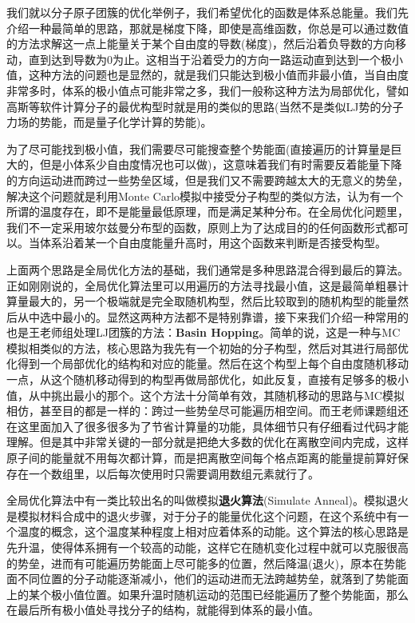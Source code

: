 \documentclass[12pt,a4paper,openany,twoside]{book}
\numberwithin{equation}{section}
\begin{document}
      我们就以分子原子团簇的优化举例子，我们希望优化的函数是体系总能量。我们先介绍一种最简单的思路，那就是梯度下降，即使是高维函数，你总是可以通过数值的方法求解这一点上能量关于某个自由度的导数(梯度)，然后沿着负导数的方向移动，直到达到导数为0为止。这相当于沿着受力的方向一路运动直到达到一个极小值，这种方法的问题也是显然的，就是我们只能达到极小值而非最小值，当自由度非常多时，体系的极小值点可能非常之多，我们一般称这种方法为局部优化，譬如高斯等软件计算分子的最优构型时就是用的类似的思路(当然不是类似LJ势的分子力场的势能，而是量子化学计算的势能)。

      为了尽可能找到极小值，我们需要尽可能搜查整个势能面(直接遍历的计算量是巨大的，但是小体系少自由度情况也可以做)，这意味着我们有时需要反着能量下降的方向运动进而跨过一些势垒区域，但是我们又不需要跨越太大的无意义的势垒，解决这个问题就是利用Monte Carlo模拟中接受分子构型的类似方法，认为有一个所谓的温度存在，即不是能量最低原理，而是满足某种分布。在全局优化问题里，我们不一定采用玻尔兹曼分布型的函数，原则上为了达成目的的任何函数形式都可以。当体系沿着某一个自由度能量升高时，用这个函数来判断是否接受构型。

      上面两个思路是全局优化方法的基础，我们通常是多种思路混合得到最后的算法。正如刚刚说的，全局优化算法里可以用遍历的方法寻找最小值，这是最简单粗暴计算量最大的，另一个极端就是完全取随机构型，然后比较取到的随机构型的能量然后从中选中最小的。显然这两种方法都不是特别靠谱，接下来我们介绍一种常用的也是王老师组处理LJ团簇的方法：\textbf{Basin Hopping}。简单的说，这是一种与MC模拟相类似的方法，核心思路为我先有一个初始的分子构型，然后对其进行局部优化得到一个局部优化的结构和对应的能量。然后在这个构型上每个自由度随机移动一点，从这个随机移动得到的构型再做局部优化，如此反复，直接有足够多的极小值，从中挑出最小的那个。这个方法十分简单有效，其随机移动的思路与MC模拟相仿，甚至目的都是一样的：跨过一些势垒尽可能遍历相空间。而王老师课题组还在这里面加入了很多很多为了节省计算量的功能，具体细节只有仔细看过代码才能理解。但是其中非常关键的一部分就是把绝大多数的优化在离散空间内完成，这样原子间的能量就不用每次都计算，而是把离散空间每个格点距离的能量提前算好保存在一个数组里，以后每次使用时只需要调用数组元素就行了。

      全局优化算法中有一类比较出名的叫做模拟\textbf{退火算法}(Simulate Anneal)。模拟退火是模拟材料合成中的退火步骤，对于分子的能量优化这个问题，在这个系统中有一个温度的概念，这个温度某种程度上相对应着体系的动能。这个算法的核心思路是先升温，使得体系拥有一个较高的动能，这样它在随机变化过程中就可以克服很高的势垒，进而有可能遍历势能面上尽可能多的位置，然后降温(退火)，原本在势能面不同位置的分子动能逐渐减小，他们的运动进而无法跨越势垒，就落到了势能面上的某个极小值位置。如果升温时随机运动的范围已经能遍历了整个势能面，那么在最后所有极小值处寻找分子的结构，就能得到体系的最小值。
\end{document}
